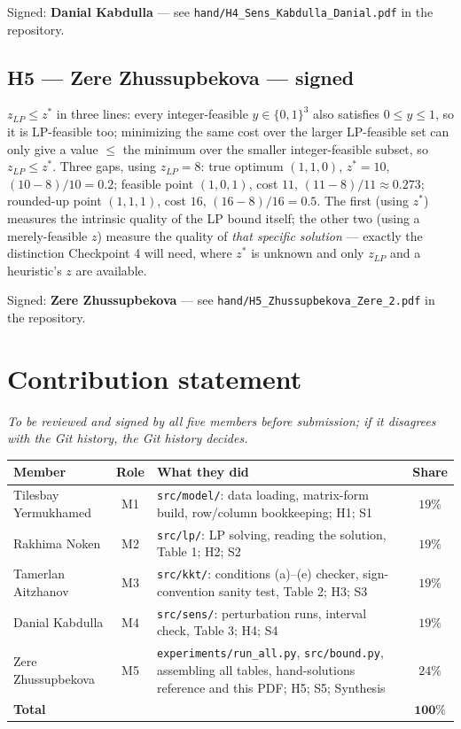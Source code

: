 \documentclass[11pt]{article}
\begin{document}
\vspace{12pt}\noindent Signed: \textbf{Danial Kabdulla} --- see \texttt{hand/H4\_Sens\_Kabdulla\_Danial.pdf} in the repository.

\subsection*{H5 --- Zere Zhussupbekova --- signed}
$z_{LP}\le z^\ast$ in three lines: every integer-feasible $y\in\{0,1\}^3$ also satisfies
$0\le y\le1$, so it is LP-feasible too; minimizing the same cost over the larger LP-feasible set
can only give a value $\le$ the minimum over the smaller integer-feasible subset, so $z_{LP}\le
z^\ast$. Three gaps, using $z_{LP}=8$: true optimum $(1,1,0)$, $z^\ast=10$,
$(10-8)/10=\mathbf{0.2}$; feasible point $(1,0,1)$, cost $11$, $(11-8)/11\approx\mathbf{0.273}$;
rounded-up point $(1,1,1)$, cost $16$, $(16-8)/16=\mathbf{0.5}$. The first (using $z^\ast$)
measures the intrinsic quality of the LP bound itself; the other two (using a merely-feasible $z$)
measure the quality of \emph{that specific solution} --- exactly the distinction Checkpoint 4 will
need, where $z^\ast$ is unknown and only $z_{LP}$ and a heuristic's $z$ are available.

\vspace{12pt}\noindent Signed: \textbf{Zere Zhussupbekova} --- see \texttt{hand/H5\_Zhussupbekova\_Zere\_2.pdf} in the repository.

\clearpage
\section*{Contribution statement}
\textit{To be reviewed and signed by all five members before submission; if it disagrees with the
Git history, the Git history decides.}

\begin{center}
\renewcommand{\arraystretch}{1.3}
\begin{tabular}{@{}>{\raggedright\arraybackslash}p{2.9cm}c>{\raggedright\arraybackslash}p{7.6cm}c@{}}
\toprule
Member & Role & What they did & Share \\
\midrule
Tilesbay Yermukhamed & M1 & \texttt{src/model/}: data loading, matrix-form build, row/column
bookkeeping; H1; S1 & $19\%$ \\
Rakhima Noken & M2 & \texttt{src/lp/}: LP solving, reading the solution, Table 1; H2; S2 & $19\%$ \\
Tamerlan Aitzhanov & M3 & \texttt{src/kkt/}: conditions (a)--(e) checker, sign-convention sanity
test, Table 2; H3; S3 & $19\%$ \\
Danial Kabdulla & M4 & \texttt{src/sens/}: perturbation runs, interval check, Table 3; H4; S4 &
$19\%$ \\
Zere Zhussupbekova & M5 & \texttt{experiments/run\_all.py}, \texttt{src/bound.py}, assembling all
tables, hand-solutions reference and this PDF; H5; S5; Synthesis & $24\%$ \\
\midrule
\textbf{Total} & & & $\mathbf{100\%}$ \\
\bottomrule
\end{tabular}
\end{center}
\end{document}
